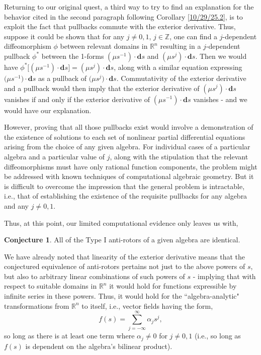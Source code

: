 \documentclass{amsart}
\theoremstyle{definition}
\newtheorem{conjecture}[theorem]{Conjecture}
\numberwithin{theorem}{section}
\numberwithin{equation}{section}
\begin{document}
Returning to our original quest, a third way to try to find an explanation for the behavior cited in the second paragraph following Corollary \ref{10/29/25.2}, is to exploit the fact that pullbacks commute with the exterior derivative.  Thus, suppose it could be shown that for any $j\ne 0,1$, $j\in\mathbb{Z}$, one can find a $j$-dependent diffeomorphism $\phi$  between relevant domains in $\mathbb{R}^n$ resulting in a $j$-dependent pullback $\phi^*$ between the 1-forms $(\mu s^{-1})\cdot \mathbf{d}s$ and $(\mu s^j)\cdot \mathbf{d}s$.   Then we would have $\phi^* \big[(\mu s^{-1})\cdot \mathbf{d}s\big] = (\mu s^j)\cdot \mathbf{d}s$, along with a similar equation expressing $\big(\mu s^{-1}\big)\cdot \mathbf{d}s$ as a pullback of $\big(\mu s^j\big)\cdot \mathbf{d}s$.  Commutativity of the exterior derivative and a pullback would then imply that the exterior derivative of $(\mu s^j)\cdot \mathbf{d}s$ vanishes if and only if the exterior derivative of $(\mu s^{-1})\cdot \mathbf{d}s$ vanishes - and we would have our explanation.

However, proving that all those pullbacks exist would involve a demonstration of the existence of solutions to each set of nonlinear partial differential equations arising from the choice of any given algebra.  For individual cases of a particular algebra and a particular value of $j$, along with the stipulation that the relevant diffeomorphisms must have only rational function components, the problem might be addressed with known techniques of computational algebraic geometry.  But it is difficult to overcome the impression that the general problem is intractable, i.e., that of establishing the existence of the requisite pullbacks for any algebra and any $j\ne 0,1$. 

Thus, at this point, our limited computational evidence only leaves us with,

\begin{conjecture}\label{10/30/25.1} All of the Type I anti-rotors of a given algebra are identical. \end{conjecture}

We have already noted that linearity of the exterior derivative means that the conjectured equivalence of anti-rotors pertains not just to the above powers of $s$, but also to arbitrary linear combinations of such powers of $s$ - implying that with respect to suitable domains in $\mathbb{R}^n$ it would hold for functions expressible by infinite series in these powers.  Thus, it would hold for the ``algebra-analytic" transformations from $\mathbb{R}^n$ to itself, i.e., vector fields having the form, \[ f(s) = \sum_{j=-\infty}^{\infty}\alpha_j s^j,\] so long as there is at least one term where $\alpha_j\ne 0$ for $j\ne 0,1$ (i.e., so long as $f(s)$ is dependent on the algebra's bilinear product).  
\end{document}

